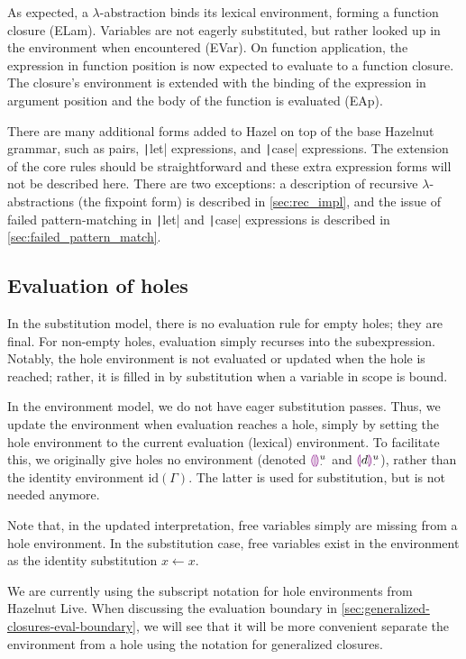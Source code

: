As expected, a $\lambda$-abstraction binds its lexical environment, forming a function closure (ELam). Variables are not eagerly substituted, but rather looked up in the environment when encountered (EVar). On function application, the expression in function position is now expected to evaluate to a function closure. The closure's environment is extended with the binding of the expression in argument position and the body of the function is evaluated (EAp).

There are many additional forms added to Hazel on top of the base Hazelnut grammar, such as pairs, \texttt|let| expressions, and \texttt|case| expressions. The extension of the core rules should be straightforward and these extra expression forms will not be described here. There are two exceptions: a description of recursive $\lambda$-abstractions (the fixpoint form) is described in \cref{sec:rec_impl}, and the issue of failed pattern-matching in \texttt|let| and \texttt|case| expressions is described in \cref{sec:failed_pattern_match}.

\subsection{Evaluation of holes}
\label{sec:holeenv_evalenv_connection}

In the substitution model, there is no evaluation rule for empty holes; they are final. For non-empty holes, evaluation simply recurses into the subexpression. Notably, the hole environment is not evaluated or updated when the hole is reached; rather, it is filled in by substitution when a variable in scope is bound.

In the environment model, we do not have eager substitution passes. Thus, we update the environment when evaluation reaches a hole, simply by setting the hole environment to the current evaluation (lexical) environment. To facilitate this, we originally give holes no environment (denoted $\textcolor{violet}{\llparenthesis}\textcolor{violet}{\rrparenthesis}_\cdot^u$ and $\textcolor{violet}{\llparenthesis} d\textcolor{violet}{\rrparenthesis}_\cdot^u$), rather than the identity environment $\text{id}(\Gamma)$. The latter is used for substitution, but is not needed anymore.

Note that, in the updated interpretation, free variables simply are missing from a hole environment. In the substitution case, free variables exist in the environment as the identity substitution $x\leftarrow x$.

We are currently using the subscript notation for hole environments from Hazelnut Live. When discussing the evaluation boundary in \cref{sec:generalized-closures-eval-boundary}, we will see that it will be more convenient separate the environment from a hole using the notation for generalized closures.

